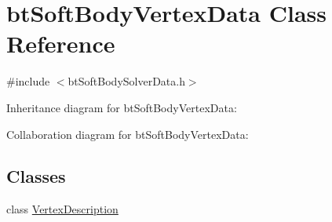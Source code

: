 \hypertarget{classbt_soft_body_vertex_data}{\section{bt\+Soft\+Body\+Vertex\+Data Class Reference}
\label{classbt_soft_body_vertex_data}
}


{\ttfamily \#include $<$bt\+Soft\+Body\+Solver\+Data.\+h$>$}



Inheritance diagram for bt\+Soft\+Body\+Vertex\+Data\+:


Collaboration diagram for bt\+Soft\+Body\+Vertex\+Data\+:
\subsection*{Classes}
\begin{DoxyCompactItemize}
\item 
class \hyperlink{classbt_soft_body_vertex_data_1_1_vertex_description}{Vertex\+Description}
\end{DoxyCompactItemize}
